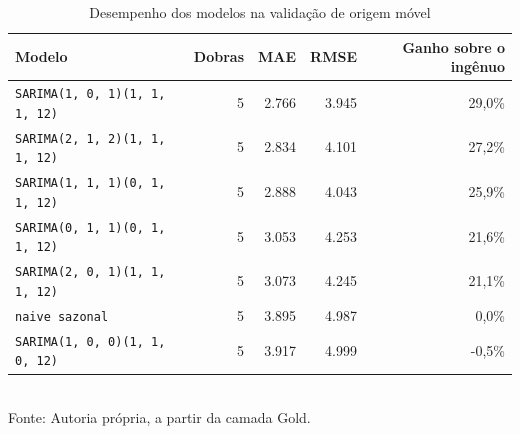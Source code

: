 \begin{table}[htbp]
    \centering
    \caption{Desempenho dos modelos na validação de origem móvel}
    \label{tab:previsao}
    \footnotesize
    \renewcommand{\arraystretch}{1.25}
    \begin{tabular}{lrrrr}
        \toprule
        \rowcolor{black!8}
        \textbf{Modelo} & \textbf{Dobras} & \textbf{MAE} & \textbf{RMSE} & \textbf{Ganho sobre o ingênuo} \\
        \midrule
        \texttt{SARIMA(1, 0, 1)(1, 1, 1, 12)} & 5 & 2.766 & 3.945 & 29,0\% \\
        \texttt{SARIMA(2, 1, 2)(1, 1, 1, 12)} & 5 & 2.834 & 4.101 & 27,2\% \\
        \texttt{SARIMA(1, 1, 1)(0, 1, 1, 12)} & 5 & 2.888 & 4.043 & 25,9\% \\
        \texttt{SARIMA(0, 1, 1)(0, 1, 1, 12)} & 5 & 3.053 & 4.253 & 21,6\% \\
        \texttt{SARIMA(2, 0, 1)(1, 1, 1, 12)} & 5 & 3.073 & 4.245 & 21,1\% \\
        \texttt{naive sazonal} & 5 & 3.895 & 4.987 & 0,0\% \\
        \texttt{SARIMA(1, 0, 0)(1, 1, 0, 12)} & 5 & 3.917 & 4.999 & -0,5\% \\
        \bottomrule
    \end{tabular}
    \\[4pt]
    Fonte: Autoria própria, a partir da camada Gold.
\end{table}
